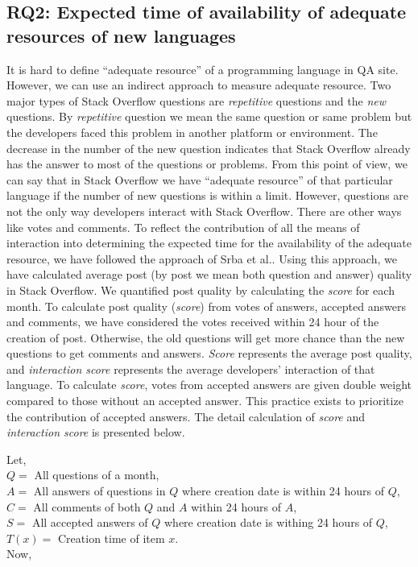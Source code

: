 \subsection{RQ2: Expected time of availability of adequate resources of new languages}
\label{RQ1}

It is hard to define ``adequate resource'' of a programming language in QA site. However, we can use an indirect approach to measure adequate resource. Two major types of Stack Overflow questions are \emph{repetitive} questions and the \emph{new} questions. By \emph{repetitive} question we mean the same question or same problem but the developers \citep{TausczikWC17} faced this problem in another platform or environment. The decrease in the number of the new question indicates that Stack Overflow already has the answer to most of the questions or problems. From this point of view, we can say that in Stack Overflow we have ``adequate resource'' of that particular language if the number of new questions is within a limit. However,  questions are not the only way developers interact with Stack Overflow.
There are other ways like votes and comments. To reflect the contribution of all the means of interaction into determining the expected time for the availability of the adequate resource, we have followed the approach of Srba et al.\citep{Srba2016}. Using this approach, we have calculated average post (by post we mean both question and answer) quality in Stack Overflow. We quantified post quality by calculating the \emph{score} for each month. To calculate post quality (\emph{score}) from votes of answers, accepted answers and comments, we have considered the votes received within 24 hour of the creation of post. Otherwise, the old questions will get more chance than the new questions to get comments and answers. \emph{Score} represents the average post quality, and \emph{interaction score} represents the average developers' interaction of that language. To calculate \emph{score}, votes from accepted answers are given double weight compared to those without an accepted answer. This practice exists\citep{Romano2013}  to prioritize the  contribution of accepted answers. The detail calculation of \emph{score} and \emph{interaction score} is presented below.

\noindent
Let, \\
$Q = $ {All questions of a month},\\
$A = $ {All answers of questions in $Q$ where creation date is within 24 hours of  $Q$},\\ 
$C = $ {All comments of both $Q$ and $A$ within 24 hours of $A$},\\
$S = $ {All accepted answers of $Q$ where creation date is withing 24 hours of $Q$},\\
$T(x) = $ Creation time of item $x$.\\
Now,\\


